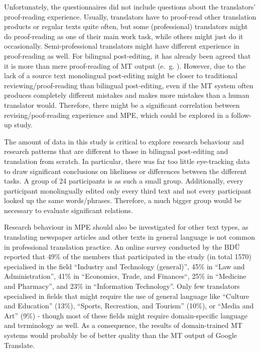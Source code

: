 \documentclass[output=paper]{langsci/langscibook}
\begin{document}
Unfortunately, the questionnaires did not include questions about the translators' proof-reading experience. Usually, translators have to proof-read other translation products or regular texts quite often, but some (professional) translators might do proof-reading as one of their main work task, while others might just do it occasionally. Semi-professional translators might have different experience in proof-reading as well. For bilingual post-editing, it has already been agreed that it is more than mere proof-reading of MT output (e.~g. \citet{obrien2002}). However, due to the lack of a source text monolingual post-editing might be closer to traditional reviewing/proof-reading than bilingual post-editing, even if the MT system often produces completely different mistakes and makes more mistakes than a human translator would. Therefore, there might be a significant correlation between revising/poof-reading experience and MPE, which could be explored in a follow-up study.


The amount of data in this study is critical to explore research behaviour and research patterns that are different to those in bilingual post-editing and translation from scratch. In particular, there was far too little eye-tracking data to draw significant conclusions on likeliness or differences between the different tasks. A group of 24 participants is as such a small group. Additionally, every participant monolingually edited only every third text and not every participant looked up the same words/phrases. Therefore, a much bigger group would be necessary to evaluate significant relations.



Research behaviour in MPE should also be investigated for other text types, as translating newspaper articles and other texts in general language is not common in professional translation practice. An online survey \citep{Hommerich2011} conducted by the BDÜ reported that 49\% of the members that participated in the study (in total 1570) specialised in the field “Industry and Technology (general)”, 45\% in “Law and Administration”, 41\% in “Economics, Trade, and Finances“, 25\% in “Medicine and Pharmacy”, and 23\% in “Information Technology”. Only few translators specialised in fields that might require the use of general language like “Culture and Education” (13\%), “Sports, Recreation, and Tourism” (10\%), or “Media and Art” (9\%) - though most of these fields might require domain-specific language and terminology as well. As a consequence, the results of domain-trained MT systems would probably be of better quality than the MT output of Google Translate.
\end{document}
